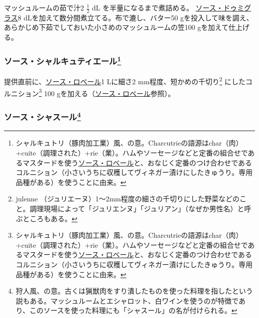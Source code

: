 \begin{recette}
マッシュルームの茹で汁2 \(\frac{1}{2}\) dL を半量になるまで煮詰める。
\protect\hyperlink{sauce-demi-glace}{ソース・ドゥミグラス}8
dLを加えて数分間煮立てる。布で漉し、バター50
gを投入して味を調え、あらかじめ下茹でしておいた小さめのマッシュルームの笠100
gを加えて仕上げる。

\hypertarget{sauce-charcutiere}{%
\subsubsection[ソース・シャルキュティエール]{\texorpdfstring{ソース・シャルキュティエール\footnote{シャルキュトリ（豚肉加工業）風、の意。Charcutrieの語源はchar（肉）
  +cuite（調理された）+rie（業）。ハムやソーセージなどと定番の組合せであるマスタードを使う\protect\hyperlink{sauce-robert}{ソース・ロベール}と、おなじく定番のつけ合わせであるコルニション（小さいうちに収穫してヴィネガー漬けにしたきゅうり。専用品種がある）を使うことに由来。}}{ソース・シャルキュティエール}}\label{sauce-charcutiere}}



提供直前に、\protect\hyperlink{sauce-robert}{ソース・ロベール}1 Lに細さ2
mm程度、短かめの千切り\footnote{julenne
  （ジュリエーヌ）1〜2mm程度の細さの千切りにした野菜などのこと。調理現場によって「ジュリエンヌ」「ジュリアン」（なぜか男性名）と呼ぶところもある。}
にしたコルニション\footnote{シャルキュトリ（豚肉加工業）風、の意。Charcutrieの語源はchar（肉）
  +cuite（調理された）+rie（業）。ハムやソーセージなどと定番の組合せであるマスタードを使う\protect\hyperlink{sauce-robert}{ソース・ロベール}と、おなじく定番のつけ合わせであるコルニション（小さいうちに収穫してヴィネガー漬けにしたきゅうり。専用品種がある）を使うことに由来。}
100
gを加える（\protect\hyperlink{sauce-robert}{ソース・ロベール}参照）。

\hypertarget{sauce-chasseur}{%
\subsubsection[ソース・シャスール]{\texorpdfstring{ソース・シャスール\footnote{狩人風、の意。古くは猟獣肉をすり潰したものを使った料理を指したという説もある。マッシュルームとエシャロット、白ワインを使うのが特徴であり、このソースを使った料理にも「シャスール」の名が付けられる。}}{ソース・シャスール}}\label{sauce-chasseur}}


\end{recette}
